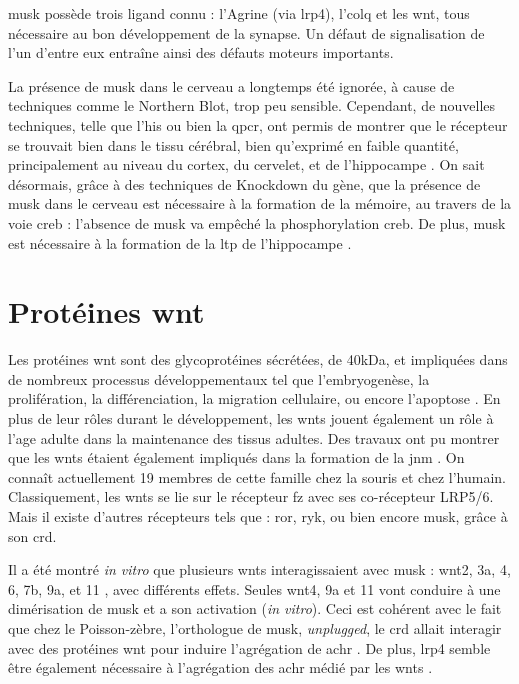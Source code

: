 	\gls{musk} possède trois ligand connu : l'Agrine (via \gls{lrp4}), l'\gls{colq} et les \gls{wnt}, tous nécessaire au bon développement de la synapse. Un défaut de signalisation de l'un d'entre eux entraîne ainsi des défauts moteurs importants.
	
	La présence de \gls{musk} dans le cerveau a longtemps été ignorée, à cause de techniques comme le Northern Blot, trop peu sensible. Cependant, de nouvelles techniques, telle que l'\gls{his} ou bien la \gls{qpcr}, ont permis de montrer que le récepteur se trouvait bien dans le tissu cérébral, bien qu'exprimé en faible quantité, principalement au niveau du cortex, du cervelet, et de l'hippocampe \cite{Garcia-Osta2006, Ksiazek2007}. On sait désormais, grâce à des techniques de Knockdown du gène, que la présence de \gls{musk} dans le cerveau est nécessaire à la formation de la mémoire, au travers de la voie \gls{creb} : l'absence de \gls{musk} va empêché la phosphorylation \gls{creb}. De plus, \gls{musk} est nécessaire à la formation de la \gls{ltp} de l'hippocampe \cite{Garcia-Osta2006}.
	
\section{Protéines \gls{wnt}}
	\label{sec:IntroWnt}
	
	Les protéines \gls{wnt} sont des glycoprotéines sécrétées, de 40kDa, et impliquées dans de nombreux processus développementaux tel que l'embryogenèse, la prolifération, la différenciation, la migration cellulaire, ou encore l'apoptose \cite{Miller2002, Willert2012a}. En plus de leur rôles durant le développement, les \glspl{wnt} jouent également un rôle à l'age adulte dans la maintenance des tissus adultes. Des travaux ont pu montrer que les \glspl{wnt} étaient également impliqués dans la formation de la \gls{jnm} \cite{Hall2000}. On connaît actuellement 19 membres de cette famille chez la souris et chez l'humain. Classiquement, les \Glspl{wnt} se lie sur le récepteur \gls{fz} avec ses co-récepteur LRP5/6. Mais il existe d'autres récepteurs tels que : \gls{ror}, \gls{ryk}, ou bien encore \gls{musk}, grâce à son \gls{crd}.
	
	Il a été montré \emph{in vitro} que plusieurs \glspl{wnt} interagissaient avec \gls{musk} : \gls{wnt}2, 3a, 4, 6, 7b, 9a, et 11 \cite{Strochlic2012, Zhang2012, Barik2014}, avec différents effets. Seules \gls{wnt}4, 9a et 11 vont conduire à une dimérisation de \gls{musk} et a son activation (\emph{in vitro}). Ceci est cohérent avec le fait que chez le Poisson-zèbre, l'orthologue de \gls{musk}, \emph{unplugged}, le \gls{crd} allait interagir avec des protéines \gls{wnt} pour induire l'agrégation de \gls{achr} \cite{Jing2009, Gordon2012}. De plus, \gls{lrp4} semble être également nécessaire à l'agrégation des \gls{achr} médié par les \gls{wnt}s \cite{Zhang2012}.
	
